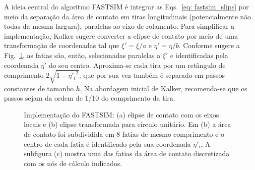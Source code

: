 A ideia central do algoritmo FASTSIM é integrar as Eqs.~\eqref{eq: fastsim_slips} por meio da separação da área de contato em
tiras longitudinais (potencialmente não todas da mesma largura), paralelas ao eixo de rolamento. Para simplificar a implementação, 
Kalker sugere converter a elipse de contato
por meio de uma transformação de coordenadas tal que $\xi'=\xi/a$ e $\eta'=\eta/b$. Conforme sugere a Fig.~\ref{fig: fatias_fastsim}, 
as fatias são, então, selecionadas paralelas a $\xi'$
e identificadas pela coordenada $\eta'$ do seu centro. Aproxima-se cada tira por um retângulo de comprimento $2\sqrt{1-{\eta'_i}^2}$,
que por sua vez também é separado em passos constantes de tamanho $h$, Na abordagem inicial de Kalker, recomenda-se que os passos 
sejam da ordem de 1/10
do comprimento da tira.

\begin{figure}
    \centering
    
    \caption{Implementação do FASTSIM: (a) elipse de contato com os eixos locais e (b) elipse transformada para
    círculo unitário. Em (b) a área de contato foi subdividida em 8 fatias de mesmo comprimento e o centro de cada
    fatia é identificado pela sua coordenada $\eta'_i$. A subfigura (c) mostra uma das fatias da área de contato
    discretizada com os nós de cálculo indicados.}
    \label{fig: fatias_fastsim}
\end{figure}



